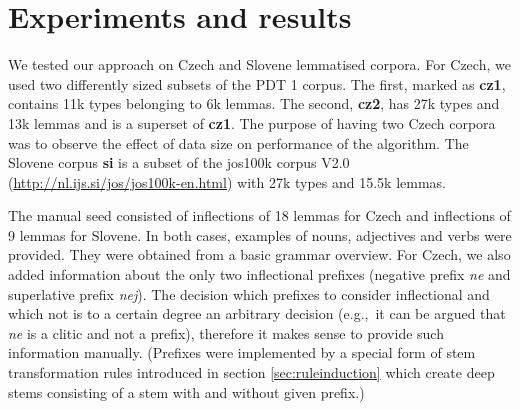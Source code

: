 \documentclass{itatnew}
\newcommand{\e}[1]{\textit{#1}} %
\newcommand{\eg}{e.g.,~}
\begin{document}
%
%

\section{Experiments and results}

We tested our approach on Czech and Slovene lemmatised corpora. For Czech, we used two differently sized subsets of the PDT 1 corpus. The first, marked as \textbf{cz1}, contains 11k types belonging to 6k lemmas. The second, \textbf{cz2}, has 27k types and 13k lemmas and is a superset of \textbf{cz1}. The purpose of having two Czech corpora was to observe the effect of data size on performance of the algorithm. The Slovene corpus \textbf{si} is a subset of the jos100k corpus V2.0 (\url{http://nl.ijs.si/jos/jos100k-en.html}) with 27k types and 15.5k lemmas.

The manual seed consisted of inflections of 18 lemmas for Czech and inflections of 9 lemmas for Slovene.  In both cases, examples of nouns, adjectives and verbs were provided. They were obtained from a basic grammar overview. For Czech, we also added information about the only two inflectional prefixes (negative prefix \e{ne} and superlative prefix \e{nej}). The decision which prefixes to consider inflectional and which not is to a certain degree an arbitrary decision (\eg it can be argued that \e{ne} is a clitic and not a prefix), therefore it makes sense to provide such information manually. (Prefixes were implemented by a special form of stem transformation rules introduced in section \ref{sec:ruleinduction} which create deep stems consisting of a stem with and without given prefix.)
\end{document}
